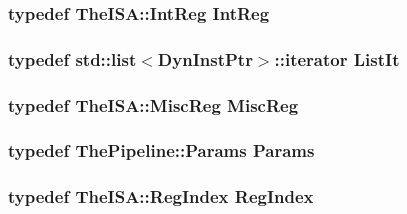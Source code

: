 \label{classInOrderCPU_aab5eeae86499f9bfe15ef79360eccc64}
\hypertarget{classInOrderCPU_a1355cb78d031430d4d70eb5080267604}{
\subsubsection[{IntReg}]{\setlength{\rightskip}{0pt plus 5cm}typedef TheISA::IntReg {\bf IntReg}}}
\label{classInOrderCPU_a1355cb78d031430d4d70eb5080267604}
\hypertarget{classInOrderCPU_a184cb829e22cc656acb41864f68f51ea}{
\subsubsection[{ListIt}]{\setlength{\rightskip}{0pt plus 5cm}typedef {\bf std::list}$<${\bf DynInstPtr}$>$::iterator {\bf ListIt}}}
\label{classInOrderCPU_a184cb829e22cc656acb41864f68f51ea}
\hypertarget{classInOrderCPU_aaf5f073a387db0556d1db4bcc45428bc}{
\subsubsection[{MiscReg}]{\setlength{\rightskip}{0pt plus 5cm}typedef TheISA::MiscReg {\bf MiscReg}}}
\label{classInOrderCPU_aaf5f073a387db0556d1db4bcc45428bc}
\hypertarget{classInOrderCPU_aa14874985381292db0aea05d1c8a122c}{
\subsubsection[{Params}]{\setlength{\rightskip}{0pt plus 5cm}typedef {\bf ThePipeline::Params} {\bf Params}}}
\label{classInOrderCPU_aa14874985381292db0aea05d1c8a122c}
\hypertarget{classInOrderCPU_a36d25e03e43fa3bb4c5482cbefe5e0fb}{
\subsubsection[{RegIndex}]{\setlength{\rightskip}{0pt plus 5cm}typedef TheISA::RegIndex {\bf RegIndex}}}
